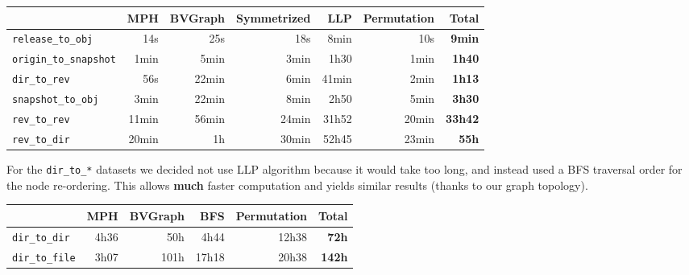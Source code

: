 \documentclass[11pt,a4paper]{article}
\begin{document}
\begin{center}
    \begin{tabular}{@{} l *6r @{}}
        \toprule
        \multicolumn{1}{c}{} &
            \textbf{MPH} &
            \textbf{BVGraph} &
            \textbf{Symmetrized} &
            \textbf{LLP} &
            \textbf{Permutation} &
            \textbf{Total} \\
        \midrule
        \texttt{release\_to\_obj}
            & 14s & 25s & 18s & 8min & 10s & \textbf{9min} \\
        \texttt{origin\_to\_snapshot}
            & 1min & 5min & 3min & 1h30 & 1min & \textbf{1h40} \\
        \texttt{dir\_to\_rev}
            & 56s & 22min & 6min & 41min & 2min & \textbf{1h13} \\
        \texttt{snapshot\_to\_obj}
            & 3min & 22min & 8min & 2h50 & 5min & \textbf{3h30} \\
        \texttt{rev\_to\_rev}
            & 11min & 56min & 24min & 31h52 & 20min & \textbf{33h42} \\
        \texttt{rev\_to\_dir}
            & 20min & 1h & 30min & 52h45 & 23min & \textbf{55h} \\
        \bottomrule
    \end{tabular}
\end{center}

\vspace{0.5cm}

For the \texttt{dir_to_*} datasets we decided not use LLP algorithm
because it would take too long, and instead used a BFS traversal order for the
node re-ordering. This allows \textbf{much} faster computation and yields
similar results (thanks to our graph topology).

\vspace{0.5cm}

\begin{center}
    \begin{tabular}{@{} l *5r @{}}
        \toprule
        \multicolumn{1}{c}{} &
            \textbf{MPH} &
            \textbf{BVGraph} &
            \textbf{BFS} &
            \textbf{Permutation} &
            \textbf{Total} \\
        \midrule
        \texttt{dir\_to\_dir}
            & 4h36 & 50h & 4h44 & 12h38 & \textbf{72h} \\
        \texttt{dir\_to\_file}
            & 3h07 & 101h & 17h18 & 20h38 & \textbf{142h} \\
        \bottomrule
    \end{tabular}
\end{center}
\end{document}
